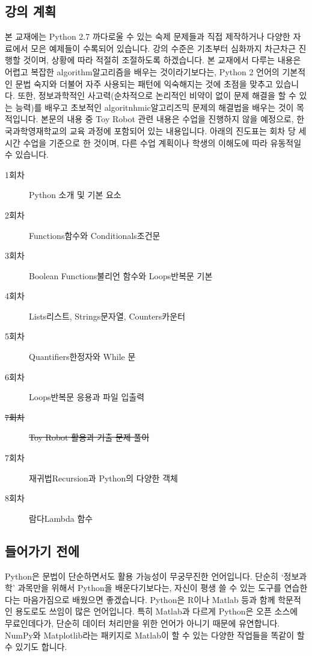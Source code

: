 \documentclass[../main.tex]{subfiles}
\begin{document}
\subsection{강의 계획}
본 교재에는 Python 2.7 까다로울 수 있는 숙제 문제들과 직접 제작하거나 다양한 자료에서 모은 예제들이 수록되어 있습니다.
강의 수준은 기초부터 심화까지 차근차근 진행할 것이며, 상황에 따라 적절히 조절하도록 하겠습니다.
본 교재에서 다루는 내용은 어렵고 복잡한 algorithm알고리즘을 배우는 것이라기보다는, Python 2 언어의 기본적인 문법 숙지와 더불어 자주 사용되는 패턴에 익숙해지는 것에 초점을 맞추고 있습니다.
또한, 정보과학적인 사고력(순차적으로 논리적인 비약이 없이 문제 해결을 할 수 있는 능력)를 배우고 초보적인 algoritnhmic알고리즈믹 문제의 해결법을 배우는 것이 목적입니다.
본문의 내용 중 Toy Robot 관련 내용은 수업을 진행하지 않을 예정으로, 한국과학영재학교의 교육 과정에 포함되어 있는 내용입니다.
아래의 진도표는 회차 당 세 시간 수업을 기준으로 한 것이며, 다른 수업 계획이나 학생의 이해도에 따라 유동적일 수 있습니다.

\begin{description}
    \item[1회차] Python 소개 및 기본 요소
    \item[2회차] Functions함수와 Conditionals조건문
    \item[3회차] Boolean Functions불리언 함수와 Loops반복문 기본
    \item[4회차] Lists리스트, Strings문자열, Counters카운터
    \item[5회차] Quantifiers한정자와 While 문
    \item[6회차] Loops반복문 응용과 파일 입출력
    \item[\sout{7회차}] \sout{Toy Robot 활용과 기출 문제 풀이}
    \item[7회차] 재귀법Recursion과 Python의 다양한 객체
    \item[8회차] 람다Lambda 함수
\end{description}

\subsection{들어가기 전에}
Python은 문법이 단순하면서도 활용 가능성이 무궁무진한 언어입니다.
단순히 `정보과학' 과목만을 위해서 Python을 배운다기보다는, 자신이 평생 쓸 수 있는 도구를 연습한다는 마음가짐으로 배웠으면 좋겠습니다.
Python은 R이나 Matlab 등과 함께 학문적인 용도로도 쓰임이 많은 언어입니다.
특히 Matlab과 다르게 Python은 오픈 소스에 무료인데다가, 단순히 데이터 처리만을 위한 언어가 아니기 때문에 유연합니다.
NumPy와 Matplotlib라는 패키지로 Matlab이 할 수 있는 다양한 작업들을 똑같이 할 수 있기도 합니다.
\end{document}
